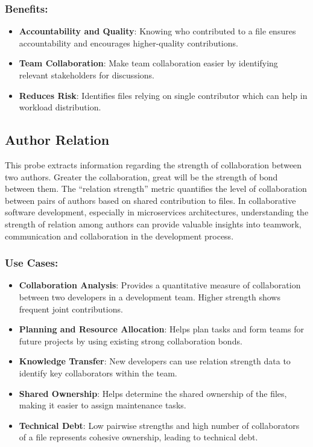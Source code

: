 \subsubsection{Benefits:}
\begin{itemize}[label=$\bullet$]
	\item \textbf{Accountability and Quality}: Knowing who contributed to a file ensures accountability and encourages higher-quality contributions.
	\item \textbf{Team Collaboration}: Make team collaboration easier by identifying relevant stakeholders for discussions.
	\item \textbf{Reduces Risk}: Identifies files relying on single contributor which can help in workload distribution.
\end{itemize} 

\subsection{Author Relation}
This probe extracts information regarding the strength of collaboration between two authors. Greater the collaboration, great will be the strength of bond between them. The ``relation strength'' metric quantifies the level of collaboration between pairs of authors based on shared contribution to files. In collaborative software development, especially in microservices architectures, understanding the strength of relation among authors can provide valuable insights into teamwork, communication and collaboration in the development process.
\subsubsection{Use Cases:}
\begin{itemize}[label=$\bullet$]
	\item \textbf{Collaboration Analysis}: Provides a quantitative measure of collaboration between two developers in a development team. Higher strength shows frequent joint contributions.
	\item \textbf{Planning and Resource Allocation}: Helps plan tasks and form teams for future projects by using existing strong collaboration bonds.
	\item \textbf{Knowledge Transfer}: New developers can use relation strength data to identify key collaborators within the team.
	\item \textbf{Shared Ownership}: Helps determine the shared ownership of the files, making it easier to assign maintenance tasks.
	\item \textbf{Technical Debt}: Low pairwise strengths and high number of collaborators of a file represents cohesive ownership, leading to technical debt.
\end{itemize}
